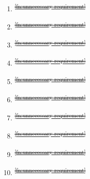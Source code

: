 \documentclass[a4paper,12pt,twoside]{article}
\providecommand{\DIFdeltex}[1]{{\protect\color{red}\sout{#1}}}                      %
\providecommand{\DIFdelend}{} %
\providecommand{\DIFdel}[1]{\texorpdfstring{\DIFdeltex{#1}}{}} %
\DeclareRobustCommand{\DIFdelend}{\DIFOaddend \let\includegraphics\DIFOincludegraphics} %
\begin{document}
\begin{enumerate}
\item%
\DIFdel{\textsuperscript{\ref{fn:unnecessary-requirement}}
    }%
\item%
\DIFdel{\textsuperscript{\ref{fn:unnecessary-requirement}}
    }%
\item%
\DIFdel{\textsuperscript{\ref{fn:unnecessary-requirement}}
    }%
\item%
\DIFdel{\textsuperscript{\ref{fn:unnecessary-requirement}}
    }%
\item%
\DIFdel{\textsuperscript{\ref{fn:unnecessary-requirement}}
    }%
\item%
\DIFdel{\textsuperscript{\ref{fn:unnecessary-requirement}}
    }%
\item%
\DIFdel{\textsuperscript{\ref{fn:unnecessary-requirement}}
    }%
\item%
\DIFdel{\textsuperscript{\ref{fn:unnecessary-requirement}}
    }%
\item%
\DIFdel{\textsuperscript{\ref{fn:unnecessary-requirement}}
    }%
\item%
\DIFdel{\textsuperscript{\ref{fn:unnecessary-requirement}}
}\DIFdelend \end{enumerate}
\pagebreak
\end{document}
